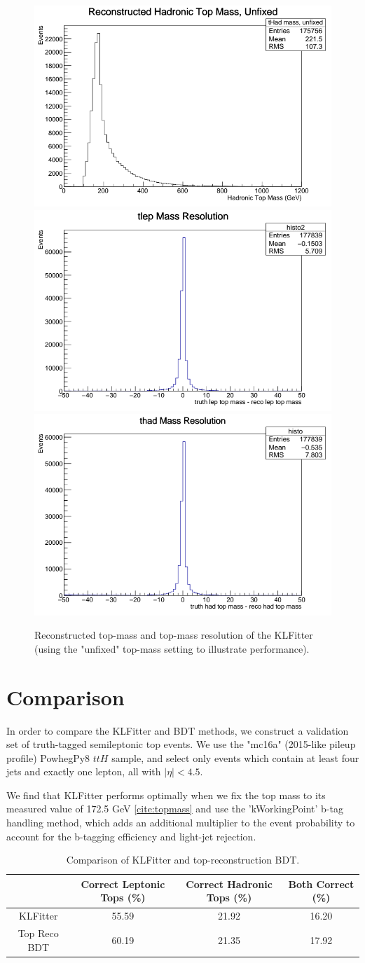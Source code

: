 \begin{figure}
	\centering
	\includegraphics[width=0.31\linewidth]{figures/KLFitter/KLFittertopmass.png}
	\includegraphics[width=0.31\linewidth]{figures/KLFitter/KLfitter1.png}
	\includegraphics[width=0.31\linewidth]{figures/KLFitter/KLfitter2.png}
	\caption{Reconstructed top-mass and top-mass resolution of the KLFitter (using the "unfixed" top-mass setting to illustrate performance).}
	\label{fig:sel_topReco_retrain}
\end{figure}

\section{Comparison} \label{sec:comparison} 

In order to compare the KLFitter and BDT methods, we construct a validation set of truth-tagged semileptonic top events. We use the "mc16a" (2015-like pileup profile) PowhegPy8 $ttH$ sample, and select only events which contain at least four jets and exactly one lepton, all with $|\eta|< 4.5$.

We find that KLFitter performs optimally when we fix the top mass to its measured value of 172.5 GeV \ref{cite:topmass} and use the 'kWorkingPoint' b-tag handling method, which adds an additional multiplier to the event probability to account for the b-tagging efficiency and light-jet rejection. 

\begin{table}[h]
    \centering
    \begin{tabular}{|c|c|c|c|}
    \hline
    & Correct Leptonic Tops (\%) & Correct Hadronic Tops (\%) & Both Correct (\%) \\ \hline
    KLFitter & 55.59 & 21.92 & 16.20 \\ \hline
    Top Reco BDT & 60.19 & 21.35 & 17.92 \\ \hline   	
    \end{tabular}
    \caption{Comparison of KLFitter and top-reconstruction BDT.}
    \label{KLFitterTable}
\end{table}
